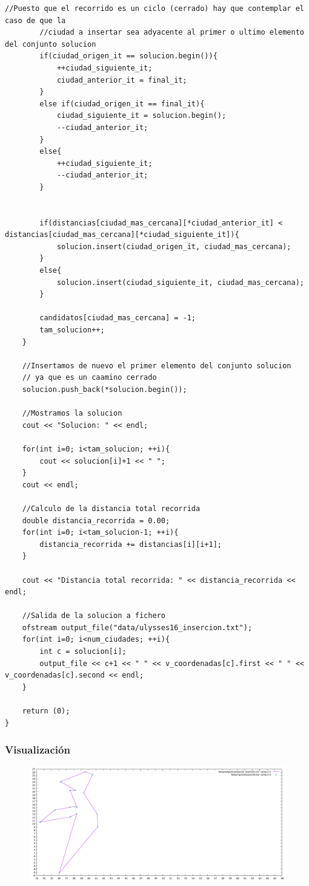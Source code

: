 \documentclass[11pt,a4paper]{article} %
\begin{document}
\begin{lstlisting}[style=C++]
		//Puesto que el recorrido es un ciclo (cerrado) hay que contemplar el caso de que la
		//ciudad a insertar sea adyacente al primer o ultimo elemento del conjunto solucion
		if(ciudad_origen_it == solucion.begin()){
			++ciudad_siguiente_it;
			ciudad_anterior_it = final_it;
		}
		else if(ciudad_origen_it == final_it){
			ciudad_siguiente_it = solucion.begin();
			--ciudad_anterior_it;
		}
		else{
			++ciudad_siguiente_it;
			--ciudad_anterior_it;
		}
		
		
		if(distancias[ciudad_mas_cercana][*ciudad_anterior_it] < distancias[ciudad_mas_cercana][*ciudad_siguiente_it]){
			solucion.insert(ciudad_origen_it, ciudad_mas_cercana);
		}
		else{
			solucion.insert(ciudad_siguiente_it, ciudad_mas_cercana);
		}
		
		candidatos[ciudad_mas_cercana] = -1;
		tam_solucion++;
	}
	
	//Insertamos de nuevo el primer elemento del conjunto solucion
	// ya que es un caamino cerrado
	solucion.push_back(*solucion.begin());
	
	//Mostramos la solucion
	cout << "Solucion: " << endl;
	
	for(int i=0; i<tam_solucion; ++i){
		cout << solucion[i]+1 << " ";
	}
	cout << endl;
	
	//Calculo de la distancia total recorrida
	double distancia_recorrida = 0.00;
	for(int i=0; i<tam_solucion-1; ++i){
		distancia_recorrida += distancias[i][i+1];
	}
	
	cout << "Distancia total recorrida: " << distancia_recorrida << endl;
	
	//Salida de la solucion a fichero
	ofstream output_file("data/ulysses16_insercion.txt");
	for(int i=0; i<num_ciudades; ++i){
		int c = solucion[i];
		output_file << c+1 << " " << v_coordenadas[c].first << " " << v_coordenadas[c].second << endl;
	}
	
	return (0);
}
\end{lstlisting}

\subsubsection{Visualización}
\begin{figure}[H]
	\centering
	\includegraphics[width=13cm]{data/graphics/insercion/insercion_final.pdf}
\end{figure}
\end{document}
